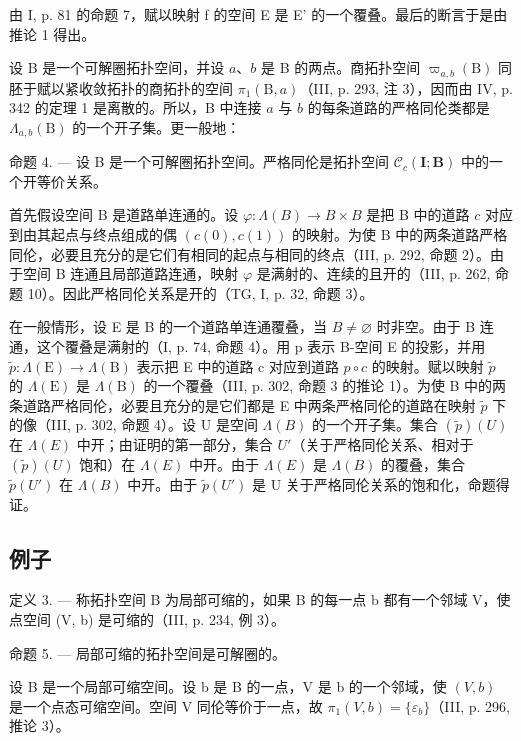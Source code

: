 由 I, p. 81 的命题 7，赋以映射 f 的空间 E 是 E' 的一个覆叠。最后的断言于是由推论 1 得出。

设 B 是一个可解圈拓扑空间，并设 \(a\)、\(b\) 是 B 的两点。商拓扑空间 \(\varpi_{a,b}(\mathrm{B})\) 同胚于赋以紧收敛拓扑的商拓扑的空间 \(\pi_1(\mathrm{B},a)\)（III, p. 293, 注 3），因而由 IV, p. 342 的定理 1 是离散的。所以，B 中连接 \(a\) 与 \(b\) 的每条道路的严格同伦类都是 \(\Lambda_{a,b}(\mathrm{B})\) 的一个开子集。更一般地：

命题 4. --- 设 B 是一个可解圈拓扑空间。严格同伦是拓扑空间 \(\mathcal{C}_{c}(\mathbf{I};\mathbf{B})\) 中的一个开等价关系。

首先假设空间 B 是道路单连通的。设 \(\varphi\colon\Lambda(B)\to B\times B\) 是把 B 中的道路 \(c\) 对应到由其起点与终点组成的偶 \((c(0),c(1))\) 的映射。为使 B 中的两条道路严格同伦，必要且充分的是它们有相同的起点与相同的终点（III, p. 292, 命题 2）。由于空间 B 连通且局部道路连通，映射 \(\varphi\) 是满射的、连续的且开的（III, p. 262, 命题 10）。因此严格同伦关系是开的（TG, I, p. 32, 命题 3）。

在一般情形，设 E 是 B 的一个道路单连通覆叠，当 \(B \neq \varnothing\) 时非空。由于 B 连通，这个覆叠是满射的（I, p. 74, 命题 4）。用 p 表示 B-空间 E 的投影，并用 \(\widetilde{p} \colon \Lambda(\mathrm{E}) \to \Lambda(\mathrm{B})\) 表示把 E 中的道路 c 对应到道路 \(p \circ c\) 的映射。赋以映射 \(\widetilde{p}\) 的 \(\Lambda(\mathrm{E})\) 是 \(\Lambda(\mathrm{B})\) 的一个覆叠（III, p. 302, 命题 3 的推论 1）。为使 B 中的两条道路严格同伦，必要且充分的是它们都是 E 中两条严格同伦的道路在映射 \(\widetilde{p}\) 下的像（III, p. 302, 命题 4）。设 U 是空间 \(\Lambda(B)\) 的一个开子集。集合 \((\widetilde{p})(U)\) 在 \(\Lambda(E)\) 中开；由证明的第一部分，集合 \(U'\)（关于严格同伦关系、相对于 \((\widetilde{p})(U)\) 饱和）在 \(\Lambda(E)\) 中开。由于 \(\Lambda(E)\) 是 \(\Lambda(B)\) 的覆叠，集合 \(\widetilde{p}(U')\) 在 \(\Lambda(B)\) 中开。由于 \(\widetilde{p}(U')\) 是 U 关于严格同伦关系的饱和化，命题得证。

\subsection{例子}


定义 3. --- 称拓扑空间 B 为局部可缩的，如果 B 的每一点 b 都有一个邻域 V，使点空间 (V, b) 是可缩的（III, p. 234, 例 3）。

命题 5. --- 局部可缩的拓扑空间是可解圈的。

设 B 是一个局部可缩空间。设 b 是 B 的一点，V 是 b 的一个邻域，使 \((V, b)\) 是一个点态可缩空间。空间 V 同伦等价于一点，故 \(\pi_{1}(V, b) = \{\varepsilon_{b}\}\)（III, p. 296, 推论 3）。

